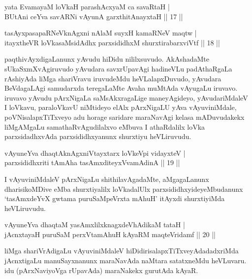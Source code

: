 \begin{shl}
yata EvamayaM loVkaH parashAcxyaM ca savaRtaH |\\
BUtAni ceYva savARNi vAyunA garxthitAnayxtaH \hfill || 17 ||
\end{shl}

\begin{shl}
tasAyxpasapaRNeV\s knAgxni nAlaM suyxH kamaRNeV maqtw |\\
itayxtheVR loVkasaMsidAdhx parxsididhxM shurxtirabarxviVtf \hfill || 18 ||
\end{shl}

\begin{artha}%
paqthivAyxdigaLanunx yAvudu hiDidu nililxsuvudo. AkAshadaMte sUkaSxmX\-vAgiruvudo yAvudara savxrUpavAgi hadineVLu padAthaRgaLa rAshiyAda liMga shariVravu iruvudeMdu heVLalapxDuvudo, yAvudara BeVdagaLAgi samudarxda teregaLaMte  Avaha muMtAda vAyugaLu iruvavo. iruvavo yAvudu pArxNigaLa saMsAkxragaLige maneyAgideyo, yAvudariMdaleV I loVkavu, paraloVkavU niMtideyo elAlx pArxNigaLU yAva vAyuviniMdale, poVNisalapxTiTxveyo adu horage saridare maraNavAgi kelasa mADuvudakekx liMgAMgaLu samathaRvAgudilalxvo eMbuva I athaRdalilx loVka parxsidadhxvAda parxsididhxyanunx shurxtiyu heVLiruvudu. 
\end{artha}

\begin{shl}
vAyuneYva dhaqtAknAgxniVtayxtarx loVkeV\s pi vidayxteV |\\
parxsididhxriti tAmAha tasAmxditeyxVvamAdinA \hfill || 19 ||
\end{shl}

\begin{artha}%
I vAyuviniMdaleV pArxNigaLu shithilavAgadaMte, aMgagaLanunx dharisi\-koMDive eMba shurxtiyalilx loVkadalUlx parxsididhxyideyeMbudanunx `tasAmxdeYvX gwtama puruSaMpeVrxta mAhuH' itAyxdi shurxtiyiMda heVLiruvudu.
\end{artha}


\begin{shl}
vAyuneYva dhaqtaM yasAmxlilxknagxdeVhAdikaM tataH |\\
jAcnxtayaH puruSaM perxVtamAhuH kAyaRM maqteVridamf \hfill || 20 ||
\end{shl}

\begin{artha}
liMga shariVrAdigaLu vAyuviniMdaleV hiDidirisalapxTiTxveyAdadadxriMda jAcnxti\-gaLu manuSayxnanunx maraNavAda naMtara satatxneMdu heVLuvaru. idu (pArxNaviyoVga rUpavAda) maraNakekx gurutAda kAyaR.
\end{artha}

